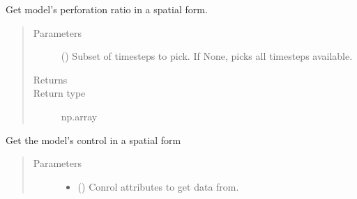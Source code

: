 \documentclass[letterpaper,10pt,english]{sphinxmanual}
\begin{document}
\begin{fulllineitems}
\begin{fulllineitems}
\begin{quote}
\begin{description}
\end{description}\end{quote}

\end{fulllineitems}


\begin{fulllineitems}
\label{\detokenize{api/field:geology.src.Field.get_spatial_perforation_ratio}}
Get model’s perforation ratio in a spatial form.
\begin{quote}\begin{description}
\item[{Parameters}] \leavevmode
{} () \textendash{} Subset of timesteps to pick. If None, picks all timesteps available.

\item[{Returns}] \leavevmode
{}

\item[{Return type}] \leavevmode
np.array

\end{description}\end{quote}

\end{fulllineitems}


\begin{fulllineitems}
\label{\detokenize{api/field:geology.src.Field.get_spatial_well_control}}
Get the model’s control in a spatial form
\begin{quote}\begin{description}
\item[{Parameters}] \leavevmode\begin{itemize}
\item {} 
 () \textendash{} Conrol attributes to get data from.


\end{itemize}
\end{description}
\end{quote}
\end{fulllineitems}
\end{fulllineitems}
\end{document}
